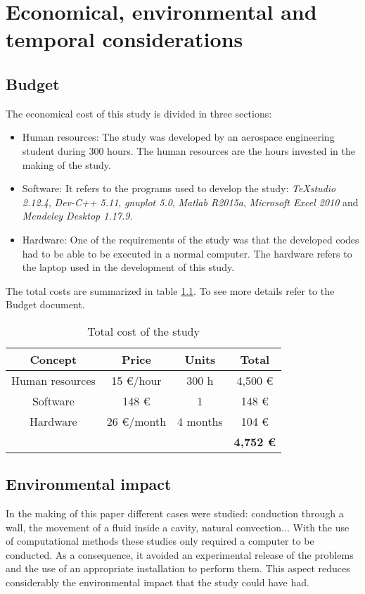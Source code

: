 \chapter{Economical, environmental and temporal considerations}

\section{Budget}
The economical cost of this study is divided in three sections:
\begin{itemize}
	\item Human resources: The study was developed by an aerospace engineering student during 300 hours. The human resources are the hours invested in the making of the study.
	\item Software: It refers to the programs used to develop the study: \textit{TeXstudio 2.12.4}, \textit{Dev-C++ 5.11}, \textit{gnuplot 5.0}, \textit{Matlab R2015a}, \textit{Microsoft Excel 2010} and \textit{Mendeley Desktop 1.17.9}.
	\item Hardware: One of the requirements of the study was that the developed codes had to be able to be executed in a normal computer. The hardware refers to the laptop used in the development of this study.
\end{itemize}
The total costs are summarized in table \ref{TotalCost}. To see more details refer to the Budget document.
\begin{table}[H]
	\centering
	\begin{tabular}{ccc|c|}
		\hline
		\multicolumn{1}{|c|}{Concept}         & \multicolumn{1}{c|}{Price}         & Units    & Total               \\ \hline
		\multicolumn{1}{|c|}{Human resources} & \multicolumn{1}{c|}{15 €/hour}     & 300 h    & 4,500 €             \\ \hline
		\multicolumn{1}{|c|}{Software}        & \multicolumn{1}{c|}{148 €}         & 1        & 148 €               \\ \hline
		\multicolumn{1}{|c|}{Hardware}        & \multicolumn{1}{c|}{26 €/month} & 4 months & 104 €            \\ \hline
		&                                    &          & \textbf{4,752 €} \\ \cline{4-4} 
	\end{tabular}
	\caption{Total cost of the study}
	\label{TotalCost}
\end{table}


\section{Environmental impact}
In the making of this paper different cases were studied: conduction through a wall, the movement of a fluid inside a cavity, natural convection... With the use of computational methods these studies only required a computer to be conducted. As a consequence, it avoided an experimental release of the problems and the use of an appropriate installation to perform them. This aspect reduces considerably the environmental impact that the study could have had.

